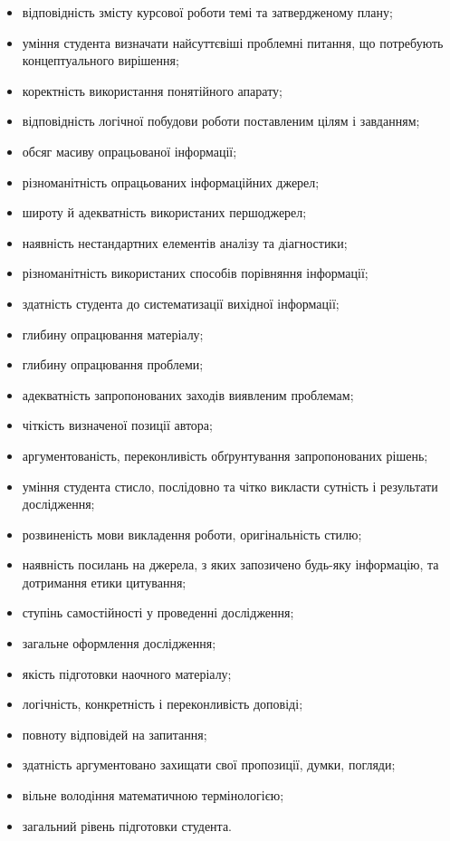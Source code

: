 \begin{itemize}
\item відповідність змісту курсової роботи темі та затвердженому плану;
\item уміння студента визначати найсуттєвіші проблемні питання, що потребують концептуального вирішення;
\item коректність використання понятійного апарату;
\item відповідність логічної побудови роботи поставленим цілям і завданням;
\item обсяг масиву опрацьованої інформації;
\item різноманітність опрацьованих інформаційних джерел;
\item широту й адекватність використаних першоджерел;
\item наявність нестандартних елементів аналізу та діагностики;
\item різноманітність використаних способів порівняння інформації;
\item здатність студента до систематизації вихідної інформації;
\item глибину опрацювання матеріалу;
\item глибину опрацювання проблеми;
\item адекватність запропонованих заходів виявленим проблемам;
\item чіткість визначеної позиції автора;
\item аргументованість, переконливість обґрунтування запропонованих рішень;
\item уміння студента стисло, послідовно та чітко викласти сутність і результати дослідження;
\item розвиненість мови викладення роботи, оригінальність стилю;
\item наявність посилань на джерела, з яких запозичено будь-яку інформацію, та дотримання етики цитування;
\item ступінь самостійності у проведенні дослідження;
\item загальне оформлення дослідження;
\item якість підготовки наочного матеріалу;
\item логічність, конкретність і переконливість доповіді;
\item повноту відповідей на запитання;
\item здатність аргументовано захищати свої пропозиції, думки, погляди;
\item вільне володіння математичною термінологією;
\item загальний рівень підготовки студента.
\end{itemize}

